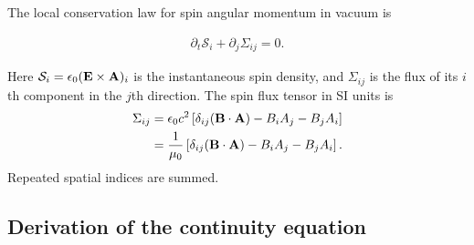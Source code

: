 The local conservation law for spin angular momentum in vacuum is
\begin{importantbox}
  \begin{align}
    \partial_t\mathcal S_i+\partial_j\Sigma_{ij}=0.
    \label{eq:canonical-sam-continuity}
  \end{align}
\end{importantbox}
Here $\mathcal S_i=\epsilon_0({\bf E}\times{\bf A})_i$ is the instantaneous
spin density, and $\Sigma_{ij}$ is the flux of its $i$th component in the
$j$th direction.  The spin flux tensor in SI units is
\begin{align}
  \Sigma_{ij}
  &=\epsilon_0c^2\left[
    \delta_{ij}({\bf B}\cdot{\bf A})-B_i A_j-B_j A_i\right]\nonumber\\
  &=\frac{1}{\mu_0}\left[
    \delta_{ij}({\bf B}\cdot{\bf A})-B_i A_j-B_j A_i\right].
  \label{eq:canonical-sam-flux-tensor}
\end{align}
Repeated spatial indices are summed.

\subsection{Derivation of the continuity equation}

